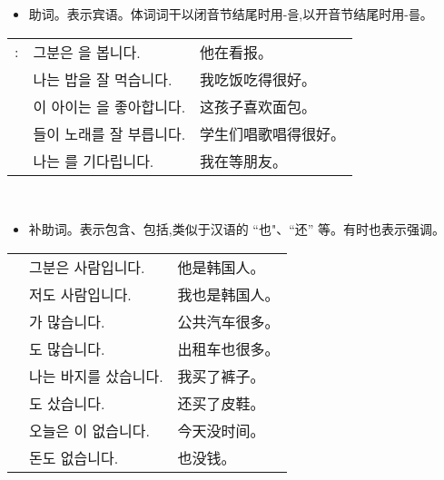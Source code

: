 \begin{grammar}
    \begin{grammarsect}[\kr -을/-를]
    \begin{itemize}
        \item 助词。表示宾语。体词词干以闭音节结尾时用{\kr -을},以开音节结尾时用{\kr -를}。
    \end{itemize}
    \begin{tabular}{lll}
        \kr \ruby{例}{예}: &\kr 그분은 \ruby{新聞}{신문}을 봅니다.&他在看报。\\
        &\kr 나는 밥을 잘 먹습니다.&我吃饭吃得很好。\\
        &\kr 이 아이는 \ruby{빵}{pão}을 좋아합니다.&这孩子喜欢面包。\\
        &\kr \ruby{學生}{학생}들이 노래를 잘 부릅니다.&学生们唱歌唱得很好。\\
        &\kr 나는 \ruby{親舊}{친구}를 기다립니다.&我在等朋友。
    \end{tabular}\\
    \end{grammarsect}
    \begin{grammarsect}[\kr -도]
        \begin{itemize}
            \item 补助词。表示包含、包括,类似于汉语的 “也"、“还” 等。有时也表示强调。
        \end{itemize}
        \begin{tabular}{lll}
            \kr \ruby{例}{예}&\kr 그분은 \ruby{韓國}{한국} 사람입니다. &他是韩国人。\\ 
            &\kr 저도 \ruby{韓國}{한국} 사람입니다.& 我也是韩国人。 \\
            &\kr \ruby{버스}{bus}가 많습니다.& 公共汽车很多。 \\
            &\kr \ruby{택시}{taxi}도 많습니다.& 出租车也很多。\\
            &\kr 나는 바지를 샀습니다. &我买了裤子。\\
            &\kr \ruby{구두}{くつ}도 샀습니다. &还买了皮鞋。\\
            &\kr 오늘은 \ruby{時間}{시간}이 없습니다. &今天没时间。\\
            &\kr 돈도 없습니다. &也没钱。 
        \end{tabular}\\
    \end{grammarsect}
    \begin{grammarsect}[\kr -고 싶다]
        \begin{itemize}

\end{itemize}
\end{grammarsect}
\end{grammar}
